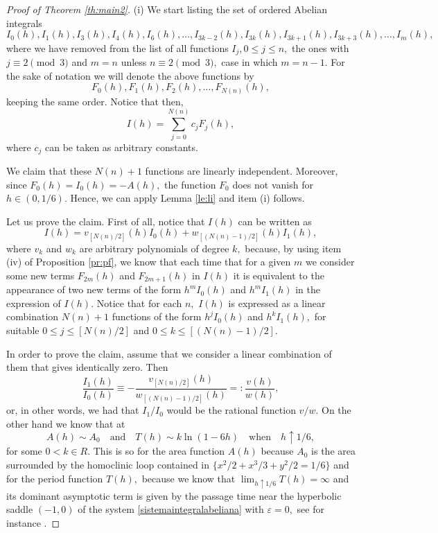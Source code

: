 \documentclass[12pt,a4paper,reqno]{amsart}
\begin{document}
\begin{proof}[Proof of Theorem \ref{th:main2}]

(i) We start listing the set of ordered Abelian integrals
\[
I_0(h),I_1(h),I_3(h),I_4(h),I_6(h),\ldots,
I_{3k-2}(h),I_{3k}(h),I_{3k+1}(h),I_{3k+3}(h),\ldots,I_m(h),
\]
where we have removed from the list of all functions $I_j, 0\le j\le
n,$ the ones  with $j\equiv 2 \pmod 3$ and $m=n$ unless $n\equiv 2
\pmod 3,$ case in which $m=n-1.$ For the sake of notation we will
denote the above functions by
\[
F_0(h),F_1(h),F_2(h),\ldots, F_{N(n)}(h),
\]
keeping the same order. Notice that then,
\begin{equation}\label{eq:Fs}
I(h)=\sum_{j=0}^{N(n)} c_j F_j(h),
\end{equation}
where $c_j$ can be taken as arbitrary constants.

We claim that these $N(n)+1$ functions are linearly independent.
Moreover, since $F_0(h)=I_0(h)=-A(h),$ the function $F_0$ does not
vanish for $h\in(0,1/6).$ Hence, we can apply Lemma \ref{le:li} and
item (i) follows.

Let us prove the claim. First of all, notice that $I(h)$ can be
written as
\[
I(h)= v_{[N(n)/2]}(h) I_0(h)+ w_{[(N(n)-1)/2]}(h) I_1(h),
\]
where $v_k$ and $w_k$ are arbitrary polynomials of degree $k,$
because, by using item (iv) of Proposition \ref{pr:pf}, we know that
each time that for a given $m$ we consider some new terms
$F_{2m}(h)$ and $F_{2m+1}(h)$ in $I(h)$ it is equivalent to the
appearance of  two new terms of the form $h^m I_0(h)$ and $h^m
I_1(h)$ in the expression of $I(h).$ Notice that for each $n,$
$I(h)$ is expressed as a linear combination  $N(n)+1$ functions of
the form $h^jI_0(h)$ and $h^kI_1(h),$ for suitable  $0\le j\le
[N(n)/2]$ and $0\le k\le [(N(n)-1)/2].$

In order to prove the claim, assume that we consider a linear
combination of them that gives identically zero. Then
\[
\frac{I_1(h)}{I_0(h)}\equiv
-\frac{v_{[N(n)/2]}(h)}{w_{[(N(n)-1)/2]}(h)}=:\frac{v(h)}{w(h)},
\]
or, in other words, we had that $I_1/I_0$ would be the rational
function  $v/w.$ On the other hand we know that at
\[
A(h)\sim A_0 \quad\mbox{and} \quad T(h)\sim
k\ln(1-6h)\quad\mbox{when}\quad h\uparrow 1/6,
\]
for some $0<k\in R.$ This is so for the area function $A(h)$ because
$A_0$ is the area surrounded by the homoclinic loop contained in
$\{x^2/2+x^3/3+y^2/2=1/6\}$ and for the period function $T(h),$
because we know that $\lim_{h\uparrow 1/6}T(h)=\infty$ and its dominant
asymptotic term is given by the passage time near the hyperbolic
saddle $(-1,0)$ of the system \eqref{sistemaintegralabeliana} with
$\varepsilon=0,$ see for instance \cite{GasManVil}.


\end{proof}
\end{document}
